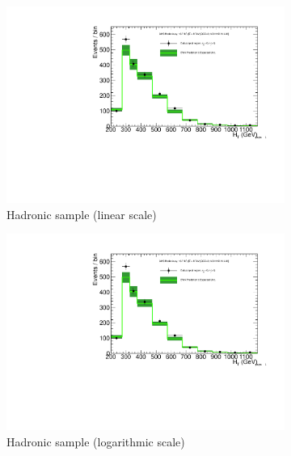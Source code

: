 \clearpage
\begin{figure}[h!]
  \centering
  \begin{subfigure}[b]{0.48\textwidth}
    \includegraphics[width=\textwidth,page=1]
    {Figs/results/v0/greenBand/bestFit_2012dev_RQcdZero_fZinvAll_0b_ge4j-12p_smOnly}
    \caption{Hadronic sample (linear scale)}
  \end{subfigure}
  \begin{subfigure}[b]{0.48\textwidth}
    \includegraphics[width=\textwidth,page=2]
    {Figs/results/v0/greenBand/bestFit_2012dev_RQcdZero_fZinvAll_0b_ge4j-12p_smOnly}
    \caption{Hadronic sample (logarithmic scale)}
  \end{subfigure}
  \begin{subfigure}[b]{0.48\textwidth}

\end{subfigure}
\end{figure}
